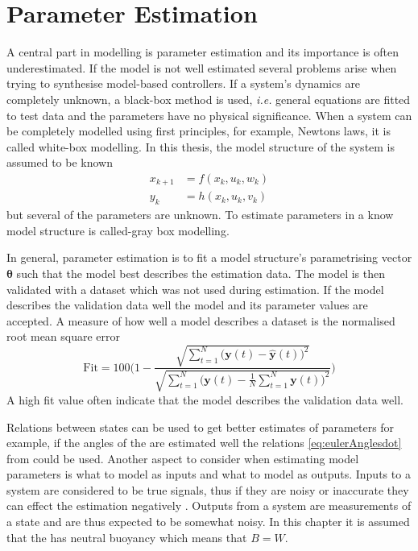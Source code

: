 \chapter{Parameter Estimation} \label{cha:parameterEstimation}
A central part in modelling is parameter estimation and its importance is often underestimated. If the model is not well estimated several problems arise when trying to synthesise model-based controllers. If a system's dynamics are completely unknown, a black-box method is used, \emph{i.e.} general equations are fitted to test data and the parameters have no physical significance. When a system can be completely modelled using first principles, for example, Newtons laws, it is called white-box modelling. In this thesis, the model structure of the system is assumed to be known
\begin{align}
x_{k+1} &=f(x_k,u_k,w_k)\\
y_{k} &= h(x_k,u_k,v_k)
\end{align}
but several of the parameters are unknown.
To estimate parameters in a know model structure is called-gray box modelling. 

In general, parameter estimation is to fit a model structure's parametrising vector $\boldsymbol{\theta}$ such that the model best describes the estimation data. The model is then validated with a dataset which was not used during estimation. If the model describes the validation data well the model and its parameter values are accepted. A measure of how well a model describes a dataset is the normalised root mean square error
\begin{equation}
\text{Fit} = 100 \Biggr(1 - \frac{\sqrt{\sum\limits_{t=1}^N \bigr(\boldsymbol{y}(t) - \hat{\boldsymbol{y}}(t)\bigl)^2}}{\sqrt{\sum\limits_{t=1}^N \bigr(\boldsymbol{y}(t)-\frac{1}{N}\sum\limits_{t=1}^N \boldsymbol{y}(t)\bigl)^2}}\Biggl)
\end{equation} 
A high fit value often indicate that the model describes the validation data well.

Relations between states can be used to get better estimates of parameters for example, if the angles of the \abbrROV are estimated well the relations \eqref{eq:eulerAnglesdot} from  could be used. Another aspect to consider when estimating model parameters is what to model as inputs and what to model as outputs. Inputs to a system are considered to be true signals, thus if they are noisy or inaccurate they can effect the estimation negatively \citep{modellbygge}. Outputs from a system are measurements of a state and are thus expected to be somewhat noisy. In this chapter it is assumed that the \abbrROV has neutral buoyancy which means that $B = W$. 

